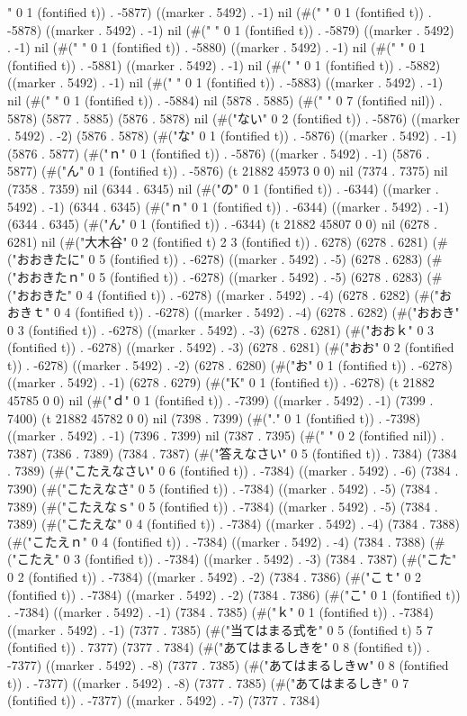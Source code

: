 " 0 1 (fontified t)) . -5877) ((marker . 5492) . -1) nil (#("	" 0 1 (fontified t)) . -5878) ((marker . 5492) . -1) nil (#("	" 0 1 (fontified t)) . -5879) ((marker . 5492) . -1) nil (#(" " 0 1 (fontified t)) . -5880) ((marker . 5492) . -1) nil (#(" " 0 1 (fontified t)) . -5881) ((marker . 5492) . -1) nil (#(" " 0 1 (fontified t)) . -5882) ((marker . 5492) . -1) nil (#(" " 0 1 (fontified t)) . -5883) ((marker . 5492) . -1) nil (#(" " 0 1 (fontified t)) . -5884) nil (5878 . 5885) (#("	      " 0 7 (fontified nil)) . 5878) (5877 . 5885) (5876 . 5878) nil (#("ない" 0 2 (fontified t)) . -5876) ((marker . 5492) . -2) (5876 . 5878) (#("な" 0 1 (fontified t)) . -5876) ((marker . 5492) . -1) (5876 . 5877) (#("ｎ" 0 1 (fontified t)) . -5876) ((marker . 5492) . -1) (5876 . 5877) (#("ん" 0 1 (fontified t)) . -5876) (t 21882 45973 0 0) nil (7374 . 7375) nil (7358 . 7359) nil (6344 . 6345) nil (#("の" 0 1 (fontified t)) . -6344) ((marker . 5492) . -1) (6344 . 6345) (#("ｎ" 0 1 (fontified t)) . -6344) ((marker . 5492) . -1) (6344 . 6345) (#("ん" 0 1 (fontified t)) . -6344) (t 21882 45807 0 0) nil (6278 . 6281) nil (#("大木谷" 0 2 (fontified t) 2 3 (fontified t)) . 6278) (6278 . 6281) (#("おおきたに" 0 5 (fontified t)) . -6278) ((marker . 5492) . -5) (6278 . 6283) (#("おおきたｎ" 0 5 (fontified t)) . -6278) ((marker . 5492) . -5) (6278 . 6283) (#("おおきた" 0 4 (fontified t)) . -6278) ((marker . 5492) . -4) (6278 . 6282) (#("おおきｔ" 0 4 (fontified t)) . -6278) ((marker . 5492) . -4) (6278 . 6282) (#("おおき" 0 3 (fontified t)) . -6278) ((marker . 5492) . -3) (6278 . 6281) (#("おおｋ" 0 3 (fontified t)) . -6278) ((marker . 5492) . -3) (6278 . 6281) (#("おお" 0 2 (fontified t)) . -6278) ((marker . 5492) . -2) (6278 . 6280) (#("お" 0 1 (fontified t)) . -6278) ((marker . 5492) . -1) (6278 . 6279) (#("K" 0 1 (fontified t)) . -6278) (t 21882 45785 0 0) nil (#("ｄ" 0 1 (fontified t)) . -7399) ((marker . 5492) . -1) (7399 . 7400) (t 21882 45782 0 0) nil (7398 . 7399) (#("." 0 1 (fontified t)) . -7398) ((marker . 5492) . -1) (7396 . 7399) nil (7387 . 7395) (#("		" 0 2 (fontified nil)) . 7387) (7386 . 7389) (7384 . 7387) (#("答えなさい" 0 5 (fontified t)) . 7384) (7384 . 7389) (#("こたえなさい" 0 6 (fontified t)) . -7384) ((marker . 5492) . -6) (7384 . 7390) (#("こたえなさ" 0 5 (fontified t)) . -7384) ((marker . 5492) . -5) (7384 . 7389) (#("こたえなｓ" 0 5 (fontified t)) . -7384) ((marker . 5492) . -5) (7384 . 7389) (#("こたえな" 0 4 (fontified t)) . -7384) ((marker . 5492) . -4) (7384 . 7388) (#("こたえｎ" 0 4 (fontified t)) . -7384) ((marker . 5492) . -4) (7384 . 7388) (#("こたえ" 0 3 (fontified t)) . -7384) ((marker . 5492) . -3) (7384 . 7387) (#("こた" 0 2 (fontified t)) . -7384) ((marker . 5492) . -2) (7384 . 7386) (#("こｔ" 0 2 (fontified t)) . -7384) ((marker . 5492) . -2) (7384 . 7386) (#("こ" 0 1 (fontified t)) . -7384) ((marker . 5492) . -1) (7384 . 7385) (#("ｋ" 0 1 (fontified t)) . -7384) ((marker . 5492) . -1) (7377 . 7385) (#("当てはまる式を" 0 5 (fontified t) 5 7 (fontified t)) . 7377) (7377 . 7384) (#("あてはまるしきを" 0 8 (fontified t)) . -7377) ((marker . 5492) . -8) (7377 . 7385) (#("あてはまるしきｗ" 0 8 (fontified t)) . -7377) ((marker . 5492) . -8) (7377 . 7385) (#("あてはまるしき" 0 7 (fontified t)) . -7377) ((marker . 5492) . -7) (7377 . 7384) 